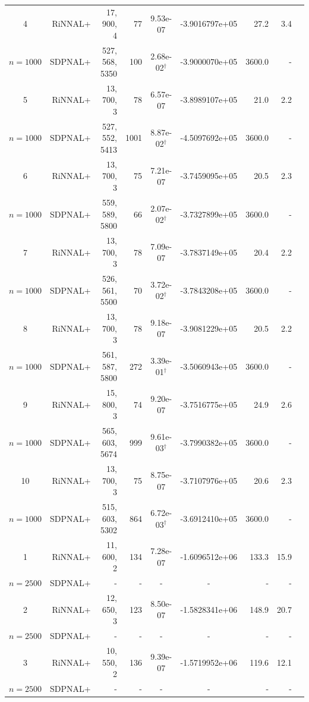 \documentclass[11pt]{article}
\theoremstyle{plain}
\begin{document}
\begin{footnotesize}
\begin{longtable}[c]{crrrccrrr}
4& RiNNAL+ & 17, 900, 4 & 77 & 9.53e-07 & -3.9016797e+05 & 27.2 &3.4 \\ 
$n=1000$ & SDPNAL+ & 527, 568, 5350 & 100& 2.68e-02$^{\dagger}$ & -3.9000070e+05 & 3600.0 & - \\ [3pt] 

5& RiNNAL+ & 13, 700, 3 & 78 & 6.57e-07 & -3.8989107e+05 & 21.0 &2.2 \\ 
$n=1000$ & SDPNAL+ & 527, 552, 5413 & 1001& 8.87e-02$^{\dagger}$ & -4.5097692e+05 & 3600.0 & - \\ [3pt] 

6& RiNNAL+ & 13, 700, 3 & 75 & 7.21e-07 & -3.7459095e+05 & 20.5 &2.3 \\ 
$n=1000$ & SDPNAL+ & 559, 589, 5800 & 66& 2.07e-02$^{\dagger}$ & -3.7327899e+05 & 3600.0 & - \\ [3pt] 

7& RiNNAL+ & 13, 700, 3 & 78 & 7.09e-07 & -3.7837149e+05 & 20.4 &2.2 \\ 
$n=1000$ & SDPNAL+ & 526, 561, 5500 & 70& 3.72e-02$^{\dagger}$ & -3.7843208e+05 & 3600.0 & - \\ [3pt] 

8& RiNNAL+ & 13, 700, 3 & 78 & 9.18e-07 & -3.9081229e+05 & 20.5 &2.2 \\ 
$n=1000$ & SDPNAL+ & 561, 587, 5800 & 272& 3.39e-01$^{\dagger}$ & -3.5060943e+05 & 3600.0 & - \\ [3pt] 

9& RiNNAL+ & 15, 800, 3 & 74 & 9.20e-07 & -3.7516775e+05 & 24.9 &2.6 \\ 
$n=1000$ & SDPNAL+ & 565, 603, 5674 & 999& 9.61e-03$^{\dagger}$ & -3.7990382e+05 & 3600.0 & - \\ [3pt] 

10& RiNNAL+ & 13, 700, 3 & 75 & 8.75e-07 & -3.7107976e+05 & 20.6 &2.3 \\ 
$n=1000$ & SDPNAL+ & 515, 603, 5302 & 864& 6.72e-03$^{\dagger}$ & -3.6912410e+05 & 3600.0 & - \\ [3pt] 

1& RiNNAL+ & 11, 600, 2 & 134 & 7.28e-07 & -1.6096512e+06 & 133.3 &15.9 \\ 
$n=2500$ & SDPNAL+ & - & - & - & - & - & - \\ [3pt] 

2& RiNNAL+ & 12, 650, 3 & 123 & 8.50e-07 & -1.5828341e+06 & 148.9 &20.7 \\ 
$n=2500$ & SDPNAL+ & - & - & - & - & - & - \\ [3pt] 

3& RiNNAL+ & 10, 550, 2 & 136 & 9.39e-07 & -1.5719952e+06 & 119.6 &12.1 \\ 
$n=2500$ & SDPNAL+ & - & - & - & - & - & - \\ [3pt] 


\end{longtable}
\end{footnotesize}
\end{document}

